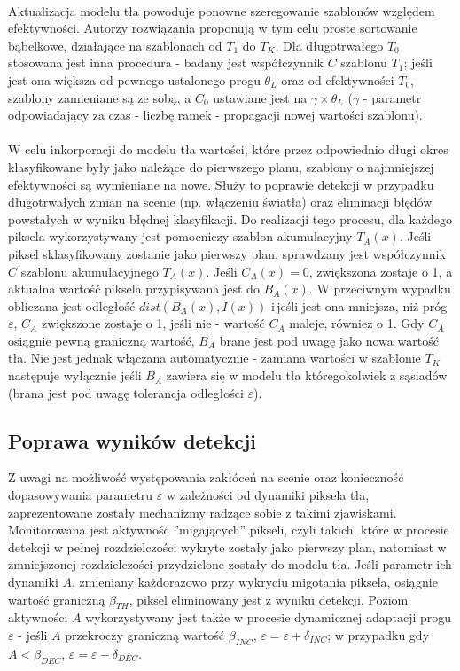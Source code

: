 \paragraph{}
Aktualizacja modelu tła powoduje ponowne szeregowanie szablonów względem efektywności. Autorzy rozwiązania proponują w tym celu proste sortowanie bąbelkowe, działające na szablonach od $T_{1}$ do $T_{K}$. Dla długotrwałego $T_{0}$ stosowana jest inna procedura - badany jest współczynnik $C$ szablonu $T_{1}$; jeśli jest ona większa od pewnego ustalonego progu $\theta_{L}$ oraz od efektywności $T_{0}$, szablony zamieniane są ze sobą, a $C_{0}$ ustawiane jest na $\gamma \times \theta_{L}$ ($\gamma$ - parametr odpowiadający za czas - liczbę ramek - propagacji nowej wartości szablonu).
\paragraph{}
W celu inkorporacji do modelu tła wartości, które przez odpowiednio długi okres klasyfikowane były jako należące do pierwszego planu, szablony o najmniejszej efektywności są wymieniane na nowe. Służy to poprawie detekcji w przypadku długotrwałych zmian na scenie (np. włączeniu światła) oraz eliminacji błędów powstałych w wyniku błędnej klasyfikacji. Do realizacji tego procesu, dla każdego piksela wykorzystywany jest pomocniczy szablon akumulacyjny $T_{A}(x)$. Jeśli piksel sklasyfikowany zostanie jako pierwszy plan, sprawdzany jest współczynnik $C$ szablonu akumulacyjnego $T_{A}(x)$. Jeśli $C_{A}(x)=0$, zwiększona zostaje o 1, a aktualna wartość piksela przypisywana jest do $B_{A}(x)$. W przeciwnym wypadku obliczana jest odległość $dist(B_{A}(x),I(x))$ i\,jeśli jest ona mniejsza, niż próg $\varepsilon$, $C_{A}$ zwiększone zostaje o 1, jeśli nie - wartość $C_{A}$ maleje, również o 1. Gdy $C_{A}$ osiągnie pewną graniczną wartość, $B_{A}$ brane jest pod uwagę jako nowa wartość tła. Nie jest jednak włączana automatycznie - zamiana wartości w szablonie $T_{K}$ następuje wyłącznie jeśli $B_{A}$ zawiera się w modelu tła któregokolwiek z sąsiadów (brana jest pod uwagę tolerancja odległości $\varepsilon$).
\subsection{Poprawa wyników detekcji}
Z uwagi na możliwość występowania zakłóceń na scenie oraz konieczność dopasowywania parametru $\varepsilon$ w zależności od dynamiki piksela tła, zaprezentowane zostały mechanizmy radzące sobie z takimi zjawiskami. Monitorowana jest aktywność ''migających'' pikseli, czyli takich, które w procesie detekcji w pełnej rozdzielczości wykryte zostały jako pierwszy plan, natomiast w zmniejszonej rozdzielczości przydzielone zostały do modelu tła. Jeśli parametr ich dynamiki $A$, zmieniany każdorazowo przy wykryciu migotania piksela, osiągnie wartość graniczną $\beta_{TH}$, piksel eliminowany jest z wyniku detekcji. Poziom aktywności $A$ wykorzystywany jest także w procesie dynamicznej adaptacji progu $\varepsilon$ - jeśli $A$ przekroczy graniczną wartość $\beta_{INC}$, $\varepsilon = \varepsilon + \delta_{INC}$; w przypadku gdy $A<\beta_{DEC}$, $\varepsilon = \varepsilon - \delta_{DEC}$. \\
